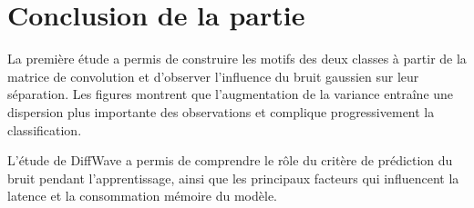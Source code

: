 \section*{Conclusion de la partie}

La première étude a permis de construire les motifs des deux classes à partir de la matrice de convolution et d'observer l'influence du bruit gaussien sur leur séparation. Les figures montrent que l'augmentation de la variance entraîne une dispersion plus importante des observations et complique progressivement la classification.

L'étude de DiffWave a permis de comprendre le rôle du critère de prédiction du bruit pendant l'apprentissage, ainsi que les principaux facteurs qui influencent la latence et la consommation mémoire du modèle.

